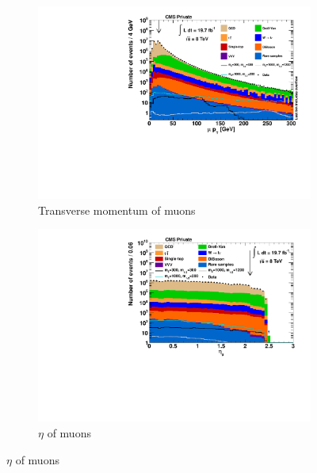 \begin{figure}[!htbp]
  \centering
  \begin{subfigure}[b]{0.495\textwidth}
    \centering
    \includegraphics[width=\textwidth]{plots/nMuon_pt.pdf}
    \caption{Transverse momentum of muons\label{fig:muo_pt}}
  \end{subfigure}
  \begin{subfigure}[b]{0.495\textwidth}
    \centering
    \includegraphics[width=\textwidth]{plots/nMuon_eta.pdf}
    \caption{$\eta$ of muons\label{fig:muo_eta}}
  \end{subfigure}
\end{figure}

